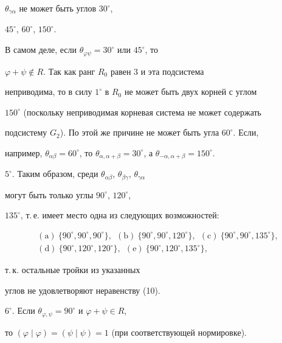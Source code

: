 \begin{pf}
$\theta_{\gamma \alpha }$ не может быть углов $30^\circ$,


$45^\circ$, $60^\circ$, $150^\circ$.


В самом деле, если $\theta_{\varphi \psi }=30^\circ$ или $45^\circ$, то


$\varphi +\psi \notin R$. Так как ранг $R_0$ равен 3 и эта подсистема


неприводима, то в силу $1^\circ$ в $R_0$ не может быть двух корней с углом


$150^\circ$ (поскольку неприводимая корневая система не может содержать


подсистему $G_2$). По этой же причине не может быть угла $60^\circ$. Если,


например, $\theta_{\alpha \beta }=60^\circ$, то $\theta_{\alpha ,\alpha


+\beta }=30^\circ$, а $\theta_{-\alpha ,\alpha +\beta }=150^\circ$.





$5^\circ$. Таким образом, среди $\theta_{\alpha \beta }$, $\theta_{\beta


\gamma }$, $\theta_{\gamma \alpha }$


могут быть только углы $90^\circ$, $120^\circ$,


$135^\circ$, т.\,е. имеет место одна из следующих возможностей:


\begin{gather*}


(\mathrm a)\ \{90^\circ,90^\circ,90^\circ\},


\ \ (\mathrm b)\ \{90^\circ,90^\circ,120^\circ\},


\ \ (\mathrm c)\ \{90^\circ,90^\circ,135^\circ\},\\


(\mathrm d)\ \{90^\circ,120^\circ,120^\circ\},


\ \ (\mathrm e)\ \{90^\circ,120^\circ,135^\circ\},


\end{gather*}


т.\,к. остальные тройки из указанных


углов не удовлетворяют неравенству (10).





$6^\circ$. Если $\theta_{\varphi,\psi}=90^\circ$ и $\varphi+\psi\in R$,


то $(\varphi\mid\varphi)=(\psi\mid\psi)=1$ (при соответствующей нормировке).



\end{pf}
